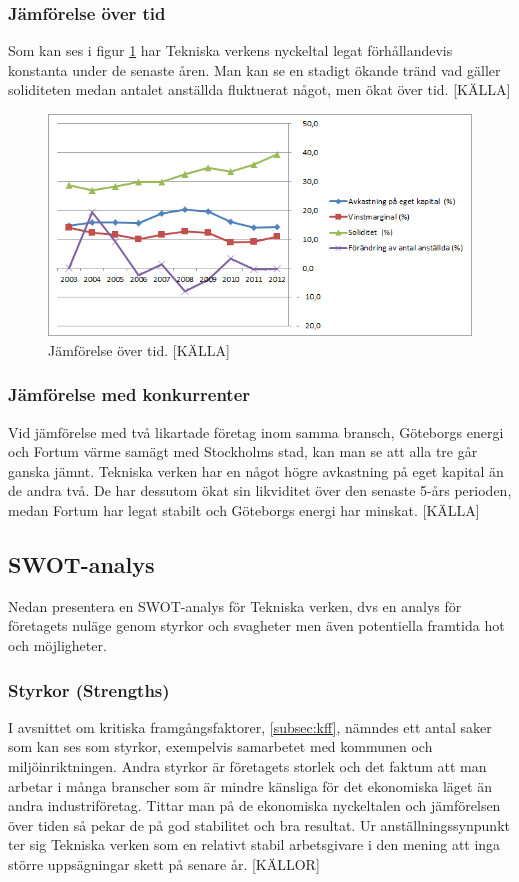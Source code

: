 \documentclass[10pt,a4paper]{article}
\begin{document}
\subsubsection{Jämförelse över tid} 
Som kan ses i figur \ref{fig:jamfor} har Tekniska verkens nyckeltal legat förhållandevis konstanta under de senaste åren. Man kan se en stadigt ökande tränd vad gäller soliditeten medan antalet anställda fluktuerat något, men ökat över tid. [KÄLLA]
\begin{figure}[H] 
\centerline{\includegraphics[scale=0.8]{Bilder/jamforelse_over_tid.png}}
\caption{Jämförelse över tid. [KÄLLA]}
\label{fig:jamfor}
\end{figure}  

\subsubsection{Jämförelse med konkurrenter}
Vid jämförelse med två likartade företag inom samma bransch, Göteborgs energi och Fortum värme samägt med Stockholms stad, kan man se att alla tre går ganska jämnt. Tekniska verken har en något högre avkastning på eget kapital än de andra två. De har dessutom ökat sin likviditet över den senaste 5-års perioden, medan Fortum har legat stabilt och Göteborgs energi har minskat. [KÄLLA]
\subsection{SWOT-analys}
Nedan presentera en SWOT-analys för Tekniska verken, dvs en analys för företagets nuläge genom styrkor och svagheter men även potentiella framtida hot och möjligheter. 

\subsubsection{Styrkor (Strengths)}
I avsnittet om kritiska framgångsfaktorer, \ref{subsec:kff}, nämndes ett antal
saker som kan ses som styrkor, exempelvis samarbetet med kommunen och
miljöinriktningen. Andra styrkor är företagets storlek och det
faktum att man arbetar i många branscher som är mindre känsliga för det
ekonomiska läget än andra industriföretag. Tittar man på de ekonomiska
nyckeltalen och jämförelsen över tiden så pekar de på god stabilitet och bra
resultat. Ur anställningssynpunkt ter sig Tekniska verken som en relativt 
stabil arbetsgivare i den mening att inga större uppsägningar skett på senare
år. [KÄLLOR]
\end{document}
